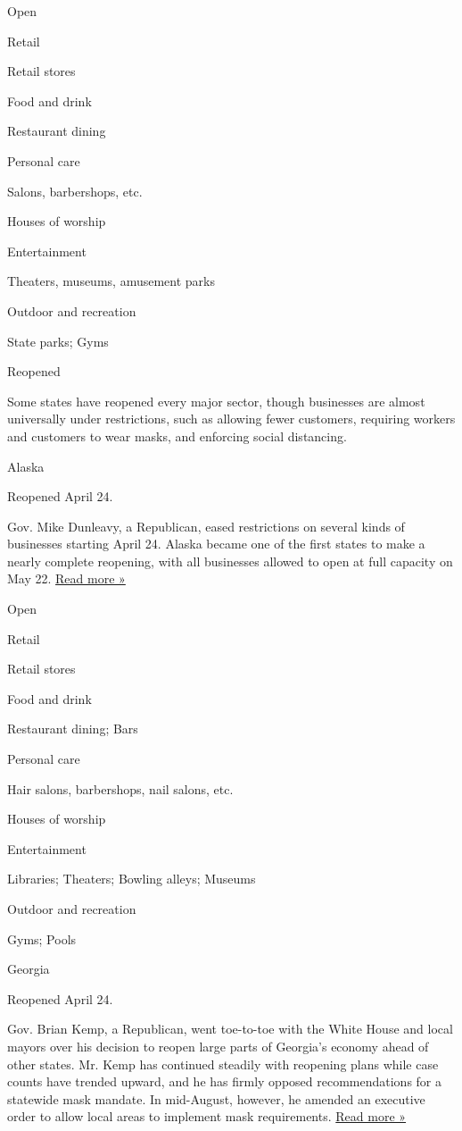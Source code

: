 Open

Retail

Retail stores

Food and drink

Restaurant dining

Personal care

Salons, barbershops, etc.

Houses of worship

Entertainment

Theaters, museums, amusement parks

Outdoor and recreation

State parks; Gyms

Reopened

Some states have reopened every major sector, though businesses are
almost universally under restrictions, such as allowing fewer customers,
requiring workers and customers to wear masks, and enforcing social
distancing.

Alaska

Reopened April 24.

Gov. Mike Dunleavy, a Republican, eased restrictions on several kinds of
businesses starting April 24. Alaska became one of the first states to
make a nearly complete reopening, with all businesses allowed to open at
full capacity on May 22.
\href{https://www.cnn.com/2020/05/21/us/alaska-reopening-friday/index.html}{Read
more »}

Open

Retail

Retail stores

Food and drink

Restaurant dining; Bars

Personal care

Hair salons, barbershops, nail salons, etc.

Houses of worship

Entertainment

Libraries; Theaters; Bowling alleys; Museums

Outdoor and recreation

Gyms; Pools

Georgia

Reopened April 24.

Gov. Brian Kemp, a Republican, went toe-to-toe with the White House and
local mayors over his decision to reopen large parts of Georgia's
economy ahead of other states. Mr. Kemp has continued steadily with
reopening plans while case counts have trended upward, and he has firmly
opposed recommendations for a statewide mask mandate. In mid-August,
however, he amended an executive order to allow local areas to implement
mask requirements.
\href{https://www.ajc.com/politics/politics-blog/kemps-latest-order-allows-local-mask-mandates-for-the-first-time/GJRZ2AXEB5GEPN2TX6BPJGEC24/}{Read
more »}

